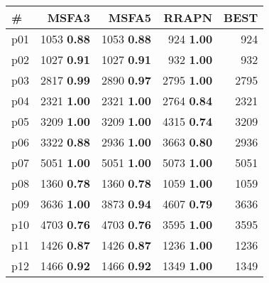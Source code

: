\begin{tabular}{lrrrr}
\toprule
\textbf{\#} & \textbf{MSFA3} & \textbf{MSFA5} & \textbf{RRAPN} & \textbf{BEST}\\
\midrule
\multicolumn{1}{l|}{p01} & {\footnotesize 1053} \textbf{0.88} & {\footnotesize 1053} \textbf{0.88} & {\footnotesize 924} \textbf{1.00} & \multicolumn{1}{|r}{924}\\
\multicolumn{1}{l|}{p02} & {\footnotesize 1027} \textbf{0.91} & {\footnotesize 1027} \textbf{0.91} & {\footnotesize 932} \textbf{1.00} & \multicolumn{1}{|r}{932}\\
\multicolumn{1}{l|}{p03} & {\footnotesize 2817} \textbf{0.99} & {\footnotesize 2890} \textbf{0.97} & {\footnotesize 2795} \textbf{1.00} & \multicolumn{1}{|r}{2795}\\
\multicolumn{1}{l|}{p04} & {\footnotesize 2321} \textbf{1.00} & {\footnotesize 2321} \textbf{1.00} & {\footnotesize 2764} \textbf{0.84} & \multicolumn{1}{|r}{2321}\\
\multicolumn{1}{l|}{p05} & {\footnotesize 3209} \textbf{1.00} & {\footnotesize 3209} \textbf{1.00} & {\footnotesize 4315} \textbf{0.74} & \multicolumn{1}{|r}{3209}\\
\multicolumn{1}{l|}{p06} & {\footnotesize 3322} \textbf{0.88} & {\footnotesize 2936} \textbf{1.00} & {\footnotesize 3663} \textbf{0.80} & \multicolumn{1}{|r}{2936}\\
\multicolumn{1}{l|}{p07} & {\footnotesize 5051} \textbf{1.00} & {\footnotesize 5051} \textbf{1.00} & {\footnotesize 5073} \textbf{1.00} & \multicolumn{1}{|r}{5051}\\
\multicolumn{1}{l|}{p08} & {\footnotesize 1360} \textbf{0.78} & {\footnotesize 1360} \textbf{0.78} & {\footnotesize 1059} \textbf{1.00} & \multicolumn{1}{|r}{1059}\\
\multicolumn{1}{l|}{p09} & {\footnotesize 3636} \textbf{1.00} & {\footnotesize 3873} \textbf{0.94} & {\footnotesize 4607} \textbf{0.79} & \multicolumn{1}{|r}{3636}\\
\multicolumn{1}{l|}{p10} & {\footnotesize 4703} \textbf{0.76} & {\footnotesize 4703} \textbf{0.76} & {\footnotesize 3595} \textbf{1.00} & \multicolumn{1}{|r}{3595}\\
\multicolumn{1}{l|}{p11} & {\footnotesize 1426} \textbf{0.87} & {\footnotesize 1426} \textbf{0.87} & {\footnotesize 1236} \textbf{1.00} & \multicolumn{1}{|r}{1236}\\
\multicolumn{1}{l|}{p12} & {\footnotesize 1466} \textbf{0.92} & {\footnotesize 1466} \textbf{0.92} & {\footnotesize 1349} \textbf{1.00} & \multicolumn{1}{|r}{1349}\\

\end{tabular}
